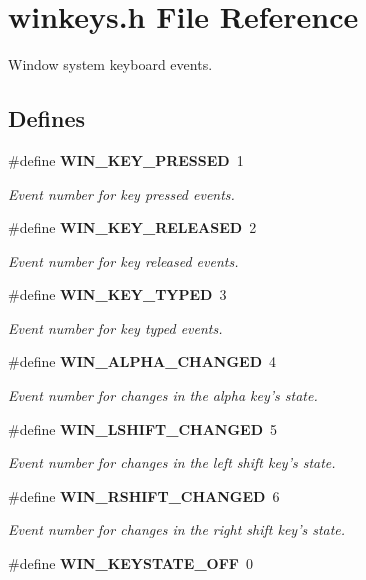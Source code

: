 \section{winkeys.h File Reference}
\label{winkeys_8h}
Window system keyboard events. 

\subsection*{Defines}
\begin{CompactItemize}
\item 
\#define {\bf WIN\_\-KEY\_\-PRESSED}~1
\begin{CompactList}\small\item\em Event number for key pressed events. \item\end{CompactList}\item 
\#define {\bf WIN\_\-KEY\_\-RELEASED}~2
\begin{CompactList}\small\item\em Event number for key released events. \item\end{CompactList}\item 
\#define {\bf WIN\_\-KEY\_\-TYPED}~3
\begin{CompactList}\small\item\em Event number for key typed events. \item\end{CompactList}\item 
\#define {\bf WIN\_\-ALPHA\_\-CHANGED}~4
\begin{CompactList}\small\item\em Event number for changes in the alpha key's state. \item\end{CompactList}\item 
\#define {\bf WIN\_\-LSHIFT\_\-CHANGED}~5
\begin{CompactList}\small\item\em Event number for changes in the left shift key's state. \item\end{CompactList}\item 
\#define {\bf WIN\_\-RSHIFT\_\-CHANGED}~6
\begin{CompactList}\small\item\em Event number for changes in the right shift key's state. \item\end{CompactList}\item 
\#define {\bf WIN\_\-KEYSTATE\_\-OFF}~0\label{winkeys_8h_a6}


\end{CompactItemize}
